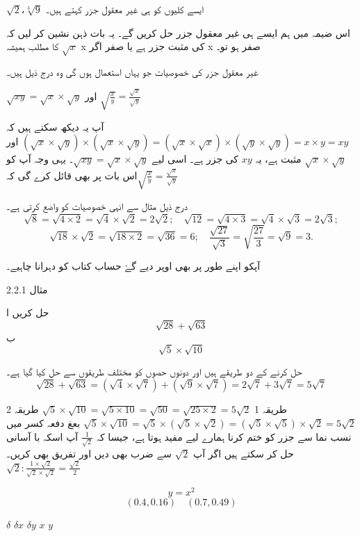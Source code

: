   \(\sqrt{2}\)،\(\sqrt[3]{9}\) ایسے کلیوں کو ہی
غیر معقول جزر کہتے ہیں۔

اس ضیمہ میں ہم ایسے ہی غیر معقول جزر حل کریں گے۔ یہ بات ذہن نشین کر لیں کہ \(\sqrt{x}\) کا مطلب ہمیشہ x کی  مثبت جزر ہے یا صفر اگر x صفر ہو تو۔

غیر معقول جزر کی خصوصیات جو یہاں استعمال ہوں گی وہ درج ذیل ہیں۔


\(\sqrt{xy}=\sqrt{x}\times\sqrt{y}\) اور \(\sqrt{\frac{x}{y}}=\frac{\sqrt{x}}{\sqrt{y}}\)

آپ یہ دیکھ سکتے ہیں کہ \((\sqrt{x}\times\sqrt{y})\times(\sqrt{x}\times\sqrt{y})=(\sqrt{x}\times\sqrt{x})\times(\sqrt{y}\times\sqrt{y})=x\times y=xy\) اور \(\sqrt{x}\times\sqrt{y}\) مثبت ہے، یہ  
 \(xy\) 
کی جزر ہے۔ اسی لیے \(\sqrt{xy}=\sqrt{x}\times\sqrt{y}\)۔ یہی وجہ آپ کو اس بات پر بھی قائل کرے گی کہ\(\sqrt{\frac{x}{y}}=\frac{\sqrt{x}}{\sqrt{y}}\)

درج ذیل مثال سے انہی خصوصیات کو واضع کرتی ہے۔
\[\sqrt{8}=\sqrt{4\times 2}=\sqrt{4}\times\sqrt{2}=2\sqrt{2};\quad\sqrt{12}=\sqrt{4\times 3}=\sqrt{4}\times\sqrt{3}=2\sqrt{3};\]
\[\sqrt{18}\times \sqrt{2}=\sqrt{18\times 2}=\sqrt{36}=6;\quad \frac{\sqrt{27}}{\sqrt{3}}=\sqrt{\frac{27}{3}}=\sqrt{9}=3.\]

آپکو اپنے طور پر بھی اوپر دیے گۓ حساب کتاب کو دہرانا چاہیے۔



مثال 2.2.1

حل کریں 
ا \[\sqrt{28}+\sqrt{63}\]
ب \[\sqrt{5}\times \sqrt{10}\]

حل کرنے کے دو طریقے ہیں اور دونوں حصوں کو مختلف طریقوں سے حل کیا گیا ہے۔
\[\sqrt{28}+\sqrt{63}=(\sqrt{4}\times\sqrt{7})+(\sqrt{9}\times\sqrt{7})=2\sqrt{7}+3\sqrt{7}=5\sqrt{7}\]

 طریقہ 1 \(\sqrt{5}\times\sqrt{10}=\sqrt{5\times10}=\sqrt{50}=\sqrt{25\times 2}=5\sqrt{2}\)
طریقہ 2 \(\sqrt{5}\times\sqrt{10}=\sqrt{5}\times(\sqrt{5}\times\sqrt{2})=(\sqrt{5}\times\sqrt{5})\times\sqrt{2}=5\sqrt{2}\)
  بعغ دفعہ کسر میں نسب نما سے جزر کو ختم کرنا ہمارے لیے مفید ہوتا ہے، جیسا کہ \(\frac{1}{\sqrt{2}}\) آپ اسکہ با آسانی حل کر سکتے ہیں اگر آپ \(\sqrt{2}\) سے ضرب بھی دیں اور تفریق بھی کریں۔\(\sqrt{2}:\frac{1\times\sqrt{2}}{\sqrt{2}\times\sqrt{2}}=\frac{\sqrt{2}}{2}\)







\[ y=x^{2}\]
\[ (0.4 , 0.16) \quad (0.7 , 0.49)\]

\( \delta\)
\(\delta x\)
\(\delta y\)
\(x\)
\(y\)




